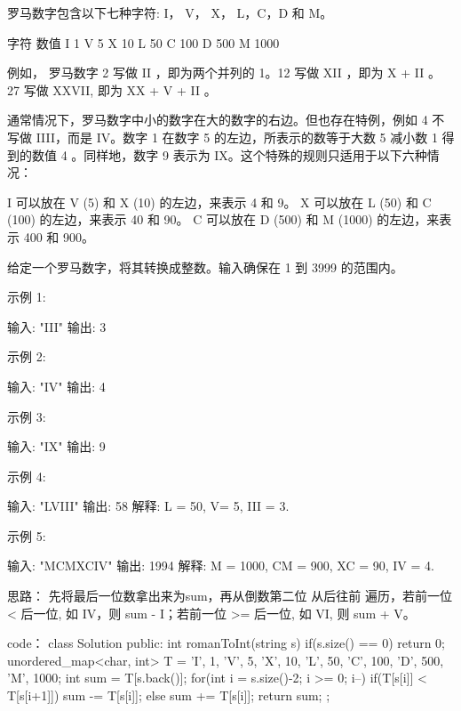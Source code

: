 罗马数字包含以下七种字符: I， V， X， L，C，D 和 M。

字符          数值
I             1
V             5
X             10
L             50
C             100
D             500
M             1000

例如， 罗马数字 2 写做 II ，即为两个并列的 1。12 写做 XII ，即为 X + II 。 27 写做  XXVII, 即为 XX + V + II 。

通常情况下，罗马数字中小的数字在大的数字的右边。但也存在特例，例如 4 不写做 IIII，而是 IV。数字 1 在数字 5 的左边，所表示的数等于大数 5 减小数 1 得到的数值 4 。同样地，数字 9 表示为 IX。这个特殊的规则只适用于以下六种情况：

    I 可以放在 V (5) 和 X (10) 的左边，来表示 4 和 9。
    X 可以放在 L (50) 和 C (100) 的左边，来表示 40 和 90。 
    C 可以放在 D (500) 和 M (1000) 的左边，来表示 400 和 900。

给定一个罗马数字，将其转换成整数。输入确保在 1 到 3999 的范围内。

示例 1:

输入: "III"
输出: 3

示例 2:

输入: "IV"
输出: 4

示例 3:

输入: "IX"
输出: 9

示例 4:

输入: "LVIII"
输出: 58
解释: L = 50, V= 5, III = 3.

示例 5:

输入: "MCMXCIV"
输出: 1994
解释: M = 1000, CM = 900, XC = 90, IV = 4.















思路：
先将最后一位数拿出来为sum，再从倒数第二位 从后往前 遍历，若前一位 < 后一位, 如 IV，则 sum - I；若前一位 >= 后一位, 如 VI, 则 sum + V。
















code：
class Solution {
public:
    int romanToInt(string s) {
        if(s.size() == 0) return 0;
        unordered_map<char, int> T = {{'I', 1},
                                        {'V', 5},
                                        {'X', 10},
                                        {'L', 50},
                                        {'C', 100},
                                        {'D', 500},
                                        {'M', 1000}};
        int sum = T[s.back()];
        for(int i = s.size()-2; i >= 0; i--)
        {
            if(T[s[i]] < T[s[i+1]]) sum -= T[s[i]];
            else sum += T[s[i]];
        }
        return sum;
    }
};